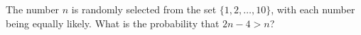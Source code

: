 The number $n$ is randomly selected from the set $\{1,2,\ldots,10\}$, with each number being equally likely. What is the probability that $2n-4>n$?
